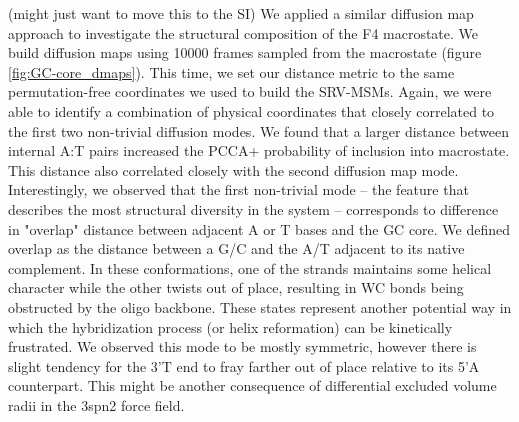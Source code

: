 \documentclass[journal=jpcbfk,manuscript=article]{achemso}
\begin{document}
(might just want to move this to the SI) We applied a similar diffusion map approach to investigate the structural composition of the F4 macrostate. We build diffusion maps using 10000 frames sampled from the macrostate (figure \ref{fig:GC-core_dmaps}). This time, we set our distance metric to the same permutation-free coordinates we used to build the SRV-MSMs. Again, we were able to identify a combination of physical coordinates that closely correlated to the first two non-trivial diffusion modes. We found that a larger distance between internal A:T pairs increased the PCCA+ probability of inclusion into macrostate. This distance also correlated closely with the second diffusion map mode. Interestingly, we observed that the first non-trivial mode -- the feature that describes the most structural diversity in the system -- corresponds to difference in "overlap" distance between adjacent A or T bases and the GC core. We defined overlap as the distance between a G/C and the A/T adjacent to its native complement. In these conformations, one of the strands maintains some helical character while the other twists out of place, resulting in WC bonds being obstructed by the oligo backbone. These states represent another potential way in which the hybridization process (or helix reformation) can be kinetically frustrated. We observed this mode to be mostly symmetric, however there is slight tendency for the 3'T end to fray farther out of place relative to its 5'A counterpart. This might be another consequence of differential excluded volume radii in the 3spn2 force field.




\end{document}
